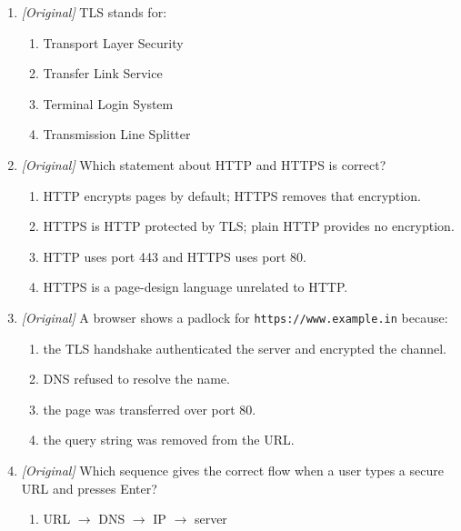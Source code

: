 \begin{enumerate}[label=\textbf{Q\arabic*.}, leftmargin=*]
  \begin{enumerate}[label=\Alph*.]
    \item Hypertext Transfer Protocol
    \item Hyperlink Transmission Process
    \item Host Text Transfer Program
    \item High-speed Transport Protocol
  \end{enumerate}
\item \textit{[Original]} TLS stands for:
  \begin{enumerate}[label=\Alph*.]
    \item Transport Layer Security
    \item Transfer Link Service
    \item Terminal Login System
    \item Transmission Line Splitter
  \end{enumerate}
\item \textit{[Original]} Which statement about HTTP and HTTPS is correct?
  \begin{enumerate}[label=\Alph*.]
    \item HTTP encrypts pages by default; HTTPS removes that encryption.
    \item HTTPS is HTTP protected by TLS; plain HTTP provides no encryption.
    \item HTTP uses port 443 and HTTPS uses port 80.
    \item HTTPS is a page-design language unrelated to HTTP.
  \end{enumerate}
\item \textit{[Original]} A browser shows a padlock for
  \texttt{https://www.example.in} because:
  \begin{enumerate}[label=\Alph*.]
    \item the TLS handshake authenticated the server and encrypted the
      channel.
    \item DNS refused to resolve the name.
    \item the page was transferred over port 80.
    \item the query string was removed from the URL.
  \end{enumerate}
\item \textit{[Original]} Which sequence gives the correct flow when a user
  types a secure URL and presses Enter?
  \begin{enumerate}[label=\Alph*.]
    \item URL $\rightarrow$ DNS $\rightarrow$ IP $\rightarrow$ server

\end{enumerate}
\end{enumerate}
